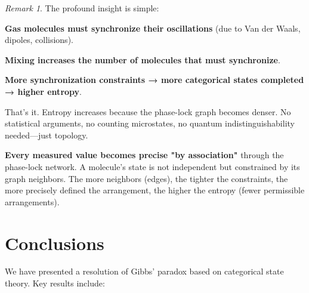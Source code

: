 \documentclass[12pt,a4paper]{article}
\theoremstyle{remark}
\newtheorem{remark}[theorem]{Remark}
\begin{document}
\begin{remark}
The profound insight is simple:

\textbf{Gas molecules must synchronize their oscillations} (due to Van der Waals, dipoles, collisions).

\textbf{Mixing increases the number of molecules that must synchronize}.

\textbf{More synchronization constraints → more categorical states completed → higher entropy}.

That's it. Entropy increases because the phase-lock graph becomes denser. No statistical arguments, no counting microstates, no quantum indistinguishability needed—just topology.

\textbf{Every measured value becomes precise "by association"} through the phase-lock network. A molecule's state is not independent but constrained by its graph neighbors. The more neighbors (edges), the tighter the constraints, the more precisely defined the arrangement, the higher the entropy (fewer permissible arrangements).
\end{remark}

\section{Conclusions}

We have presented a resolution of Gibbs' paradox based on categorical state theory. Key results include:
\end{document}
